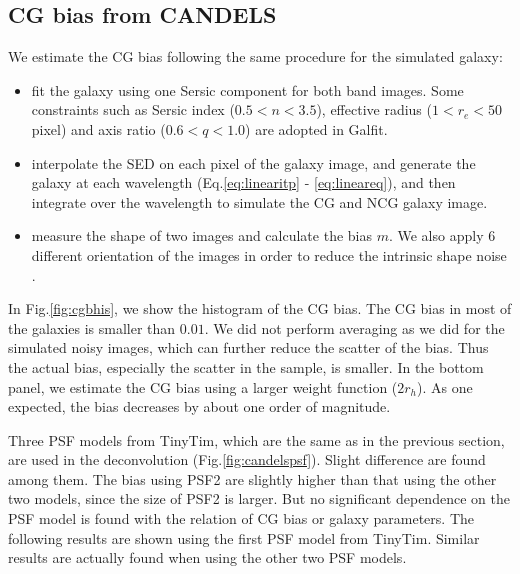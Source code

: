 \documentclass[useAMS,usenatbib]{mn2e}
\begin{document}
\subsection{CG bias from CANDELS}
We estimate the CG bias following the same procedure for the simulated galaxy:
\begin{itemize}
  \item
    fit the galaxy using one Sersic component for both band
    images. Some constraints such as Sersic index ($0.5<n<3.5$),
    effective radius ($1<r_e<50$ pixel) and axis ratio ($0.6<q<1.0$)
    are adopted in Galfit.
  \item
    interpolate the SED on each pixel of the galaxy image, and
    generate the galaxy at each wavelength (Eq.\ref{eq:linearitp} -
    \ref{eq:lineareq}), and then integrate over the wavelength to
    simulate the CG and NCG galaxy image.
  \item
    measure the shape of two images and calculate the bias $m$. We
    also apply $6$ different orientation of the images in order
    to reduce the intrinsic shape noise \citep{2007AJ....133.1763N}.
\end{itemize}
%
In Fig.\ref{fig:cgbhis}, we show the histogram of the CG bias. The CG
bias in most of the galaxies is smaller than $0.01$.
We did not perform averaging as we did
for the simulated noisy images, which can further reduce the scatter
of the bias. Thus the actual bias, especially the scatter in the
sample, is smaller. In the bottom panel, we estimate the CG bias using
a larger weight function ($2r_h$). As one expected, the bias decreases by
about one order of magnitude.

Three PSF models from TinyTim, which are the same as in the previous section,
are used in the deconvolution (Fig.\ref{fig:candelspsf}). Slight
difference are found among them. The bias using PSF2 are slightly
higher than that using the other two models, since the size of PSF2 is
larger. But no significant dependence on the PSF model is found with
the relation of CG bias or galaxy parameters. The following results
are shown using the first PSF model from TinyTim. Similar results are
actually found when using the other two PSF models.
%
\end{document}
